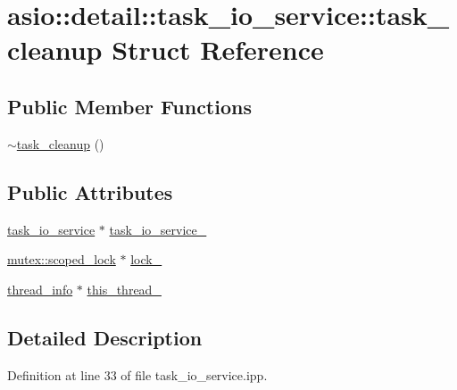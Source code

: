 \hypertarget{structasio_1_1detail_1_1task__io__service_1_1task__cleanup}{}\section{asio\+:\+:detail\+:\+:task\+\_\+io\+\_\+service\+:\+:task\+\_\+cleanup Struct Reference}
\label{structasio_1_1detail_1_1task__io__service_1_1task__cleanup}
\subsection*{Public Member Functions}
\begin{DoxyCompactItemize}
\item 
\hyperlink{structasio_1_1detail_1_1task__io__service_1_1task__cleanup_a30948d6a3722fc57792e03bb8ad9d41e}{$\sim$task\+\_\+cleanup} ()
\end{DoxyCompactItemize}
\subsection*{Public Attributes}
\begin{DoxyCompactItemize}
\item 
\hyperlink{classasio_1_1detail_1_1task__io__service}{task\+\_\+io\+\_\+service} $\ast$ \hyperlink{structasio_1_1detail_1_1task__io__service_1_1task__cleanup_aaa5e81cb755ee9b4b59d4ba48d07c5ff}{task\+\_\+io\+\_\+service\+\_\+}
\item 
\hyperlink{classasio_1_1detail_1_1null__mutex_a2cee63c1e6051f9c6a361e9b6da8f6f7}{mutex\+::scoped\+\_\+lock} $\ast$ \hyperlink{structasio_1_1detail_1_1task__io__service_1_1task__cleanup_ae9c67e42631c6773758da0c727adf4eb}{lock\+\_\+}
\item 
\hyperlink{structasio_1_1detail_1_1task__io__service__thread__info}{thread\+\_\+info} $\ast$ \hyperlink{structasio_1_1detail_1_1task__io__service_1_1task__cleanup_a7168473fa48026929f6c6a5542c468d2}{this\+\_\+thread\+\_\+}
\end{DoxyCompactItemize}


\subsection{Detailed Description}


Definition at line 33 of file task\+\_\+io\+\_\+service.\+ipp.



